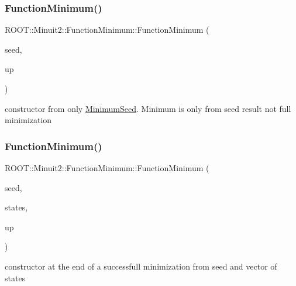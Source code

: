 \subsubsection{\texorpdfstring{FunctionMinimum()}{FunctionMinimum()}\hspace{0.1cm}{\footnotesize\ttfamily [6/10]}}
{\footnotesize\ttfamily R\+O\+O\+T\+::\+Minuit2\+::\+Function\+Minimum\+::\+Function\+Minimum (\begin{DoxyParamCaption}\item[{const \mbox{\hyperlink{classROOT_1_1Minuit2_1_1MinimumSeed}{Minimum\+Seed}} \&}]{seed,  }\item[{double}]{up }\end{DoxyParamCaption})\hspace{0.3cm}{\ttfamily [inline]}}



constructor from only \mbox{\hyperlink{classROOT_1_1Minuit2_1_1MinimumSeed}{Minimum\+Seed}}. Minimum is only from seed result not full minimization 

\mbox{\label{classROOT_1_1Minuit2_1_1FunctionMinimum_a0d5de11a4f528f8c0a0d061dbcf3e91e}} 
\subsubsection{\texorpdfstring{FunctionMinimum()}{FunctionMinimum()}\hspace{0.1cm}{\footnotesize\ttfamily [7/10]}}
{\footnotesize\ttfamily R\+O\+O\+T\+::\+Minuit2\+::\+Function\+Minimum\+::\+Function\+Minimum (\begin{DoxyParamCaption}\item[{const \mbox{\hyperlink{classROOT_1_1Minuit2_1_1MinimumSeed}{Minimum\+Seed}} \&}]{seed,  }\item[{const std\+::vector$<$ \mbox{\hyperlink{classROOT_1_1Minuit2_1_1MinimumState}{Minimum\+State}} $>$ \&}]{states,  }\item[{double}]{up }\end{DoxyParamCaption})\hspace{0.3cm}{\ttfamily [inline]}}



constructor at the end of a successfull minimization from seed and vector of states 

